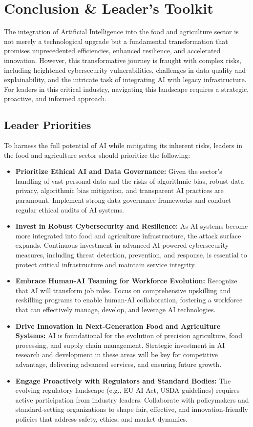 \section{Conclusion \& Leader's Toolkit}

The integration of Artificial Intelligence into the food and agriculture sector is not merely a technological upgrade but a fundamental transformation that promises unprecedented efficiencies, enhanced resilience, and accelerated innovation. However, this transformative journey is fraught with complex risks, including heightened cybersecurity vulnerabilities, challenges in data quality and explainability, and the intricate task of integrating AI with legacy infrastructure. For leaders in this critical industry, navigating this landscape requires a strategic, proactive, and informed approach.

\subsection{Leader Priorities}
To harness the full potential of AI while mitigating its inherent risks, leaders in the food and agriculture sector should prioritize the following:
\begin{itemize}
    \item \textbf{Prioritize Ethical AI and Data Governance:} Given the sector's handling of vast personal data and the risks of algorithmic bias, robust data privacy, algorithmic bias mitigation, and transparent AI practices are paramount. Implement strong data governance frameworks and conduct regular ethical audits of AI systems.
    \item \textbf{Invest in Robust Cybersecurity and Resilience:} As AI systems become more integrated into food and agriculture infrastructure, the attack surface expands. Continuous investment in advanced AI-powered cybersecurity measures, including threat detection, prevention, and response, is essential to protect critical infrastructure and maintain service integrity.
    \item \textbf{Embrace Human-AI Teaming for Workforce Evolution:} Recognize that AI will transform job roles. Focus on comprehensive upskilling and reskilling programs to enable human-AI collaboration, fostering a workforce that can effectively manage, develop, and leverage AI technologies.
    \item \textbf{Drive Innovation in Next-Generation Food and Agriculture Systems:} AI is foundational for the evolution of precision agriculture, food processing, and supply chain management. Strategic investment in AI research and development in these areas will be key for competitive advantage, delivering advanced services, and ensuring future growth.
    \item \textbf{Engage Proactively with Regulators and Standard Bodies:} The evolving regulatory landscape (e.g., EU AI Act, USDA guidelines) requires active participation from industry leaders. Collaborate with policymakers and standard-setting organizations to shape fair, effective, and innovation-friendly policies that address safety, ethics, and market dynamics.
\end{itemize}

